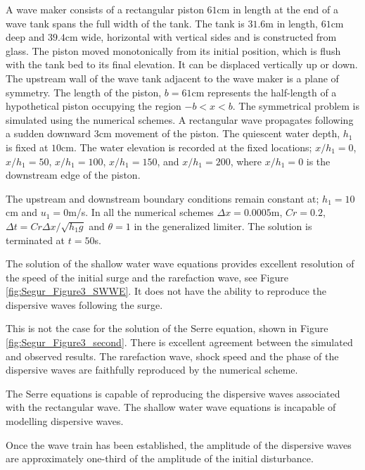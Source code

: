 \documentclass[SingleSpace,12pt]{Serre_ASCE}
\begin{document}
A wave maker consists of a rectangular piston $61$cm in length at the end of a wave tank spans the full width of the tank. The tank is $31.6$m in length, $61$cm deep and $39.4$cm wide, horizontal with vertical sides and is constructed from glass. The piston moved monotonically from its initial position, which is flush with the tank bed to its final elevation.   It can be displaced vertically up or down. The upstream wall of the wave tank adjacent to the wave maker is a plane of symmetry. The length of the piston, $b = 61$cm represents the half-length of a hypothetical piston occupying the region $-b < x < b$. The symmetrical problem is simulated using the numerical schemes. A rectangular wave propagates following a sudden downward $3$cm movement of the piston. The quiescent water depth, $h_1$ is fixed at $10$cm. The water elevation is recorded at the fixed locations; $x/h_1 = 0$, $x/h_1 = 50$, $x/h_1 = 100$, $x/h_1 = 150$, and $x/h_1 = 200$, where $x/h_1 = 0$ is the downstream edge of the piston.

The upstream and downstream boundary conditions remain constant at; $h_1 = 10$cm and $u_1 = 0$m/s. In all the numerical schemes $\Delta x = 0.0005$m, $Cr = 0.2$, $\Delta t = Cr \Delta x/\sqrt{h_1 g}$ and $\theta = 1$ in the generalized limiter. The solution is terminated at $t = 50$s.

The solution of the shallow water wave equations provides excellent resolution of the speed of the initial surge and the rarefaction wave, see Figure \ref{fig:Segur_Figure3_SWWE}. It does not have the ability to reproduce the dispersive waves following the surge.

This is not the case for the solution of the Serre equation, shown in Figure \ref{fig:Segur_Figure3_second}. There is excellent agreement between the simulated and observed results. The rarefaction wave, shock speed and the phase of the dispersive waves are faithfully reproduced by the numerical scheme.

The Serre equations is capable of reproducing the dispersive waves associated with the rectangular wave. The shallow water wave equations is incapable of modelling dispersive waves.

Once the wave train has been established, the amplitude of the dispersive waves are approximately one-third of the amplitude of the initial disturbance.
\end{document}
